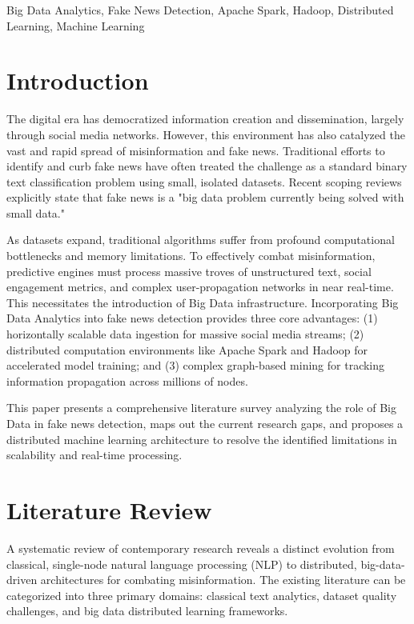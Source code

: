 \documentclass[conference]{IEEEtran}
\begin{document}
\begin{IEEEkeywords}
Big Data Analytics, Fake News Detection, Apache Spark, Hadoop, Distributed Learning, Machine Learning
\end{IEEEkeywords}

\section{Introduction}
The digital era has democratized information creation and dissemination, largely through social media networks. However, this environment has also catalyzed the vast and rapid spread of misinformation and fake news. Traditional efforts to identify and curb fake news have often treated the challenge as a standard binary text classification problem using small, isolated datasets. Recent scoping reviews \cite{b1} explicitly state that fake news is a "big data problem currently being solved with small data." 

As datasets expand, traditional algorithms suffer from profound computational bottlenecks and memory limitations. To effectively combat misinformation, predictive engines must process massive troves of unstructured text, social engagement metrics, and complex user-propagation networks in near real-time. This necessitates the introduction of Big Data infrastructure. Incorporating Big Data Analytics into fake news detection provides three core advantages: (1) horizontally scalable data ingestion for massive social media streams; (2) distributed computation environments like Apache Spark and Hadoop for accelerated model training; and (3) complex graph-based mining for tracking information propagation across millions of nodes. 

This paper presents a comprehensive literature survey analyzing the role of Big Data in fake news detection, maps out the current research gaps, and proposes a distributed machine learning architecture to resolve the identified limitations in scalability and real-time processing.

\section{Literature Review}
A systematic review of contemporary research reveals a distinct evolution from classical, single-node natural language processing (NLP) to distributed, big-data-driven architectures for combating misinformation. The existing literature can be categorized into three primary domains: classical text analytics, dataset quality challenges, and big data distributed learning frameworks.
\end{document}
